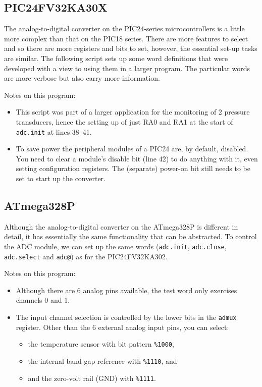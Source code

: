 \documentclass[12pt,a4paper]{article}
\newcommand{\code}[2]{
 \hrulefill
 \scriptsize
 
 \hrulefill
 \vspace{2em}
 \normalsize
}
\begin{document}
\bigskip

\subsection{PIC24FV32KA30X}
%
The analog-to-digital converter on the PIC24-series microcontrollers is a little more complex
than that on the PIC18 series.
There are more features to select and so there are more registers and bits to set, however, 
the essential set-up tasks are similar.
The following script sets up some word definitions that were developed with a view to using them 
in a larger program. 
The particular words are more verbose but also carry more information.

\bigskip\noindent
\code{}{../pic24/read-adc-pic24.txt}

\noindent
Notes on this program:
\begin{itemize}
  \item This script was part of a larger application for the monitoring of 2 pressure transducers, 
    hence the setting up of just RA0 and RA1 at the start of \verb!adc.init! at lines 38--41.
  \item To save power the peripheral modules of a PIC24 are, by default, disabled.
    You need to clear a module's disable bit (line 42) to do anything with it, 
    even setting configuration registers.
    The (separate) power-on bit still needs to be set to start up the converter.
\end{itemize}

\bigskip

\subsection{ATmega328P}
%
Although the analog-to-digital converter on the ATmega328P is different in detail,
it has essentially the same functionality that can be abstracted.
To control the ADC module, we can set up the same words 
(\verb!adc.init!, \verb!adc.close!, \verb!adc.select! and \verb!adc@!) 
as for the PIC24FV32KA302.

\bigskip\noindent
\code{}{../avr8-2016/read-adc-avr.txt}

\noindent
Notes on this program:
\begin{itemize}
  \item Although there are 6 analog pins available, the test word only exercises channels 0 and 1.
  \item The input channel selection is controlled by the lower bits in the \verb!admux! register.
    Other than the 6 external analog input pins, you can select:
    \begin{itemize}
     \item the temperature sensor with bit pattern \verb!%1000!,
     \item the internal band-gap reference with \verb!%1110!, and
     \item and the zero-volt rail (GND) with \verb!%1111!.
    \end{itemize}
\end{itemize}
\end{document}

